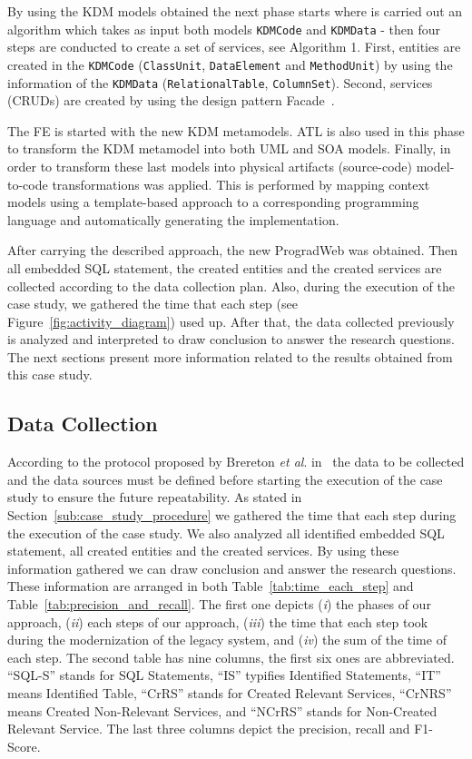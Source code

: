 \documentclass[a4paper,twoside]{article}
\begin{document}
By using the KDM models obtained the next phase starts where is carried out an algorithm which takes as input both models \texttt{KDMCode} and \texttt{KDMData} - then four steps are conducted to create a set of services, see Algorithm 1. First, entities are created in the \texttt{KDMCode} (\texttt{ClassUnit}, \texttt{DataElement} and \texttt{MethodUnit}) by using the information of the \texttt{KDMData} (\texttt{RelationalTable}, \texttt{ColumnSet}). Second, services (CRUDs) are created by using the design pattern Facade~\cite{Gamma1994}.

The FE is started with the new KDM metamodels. ATL is also used in this phase to transform the KDM metamodel into both UML and SOA models. Finally, in order to transform these last models into physical artifacts (source-code) model-to-code transformations was applied. This is performed by mapping context models using a template-based approach to a corresponding
programming language and automatically generating the implementation.

After carrying the described approach, the new ProgradWeb was obtained. Then all embedded SQL statement, the created entities and the created services are collected according to the data collection plan. Also, during the execution of the case study, we gathered the time that each step (see Figure~\ref{fig:activity_diagram}) used up. After that, the data collected previously is analyzed and interpreted to draw conclusion to answer the research questions. The next sections present more information related to the results obtained from this case study.

\subsection{Data Collection} %
\label{sub:data_collection}

According to the protocol proposed by Brereton \textit{et al}. in~\cite{case-study-template-2008} the data to be collected and the data sources must be defined before starting the execution of the case study to ensure the future repeatability. As stated in Section~\ref{sub:case_study_procedure} we gathered the time that each step during the execution of the case study. We also analyzed all identified embedded SQL statement, all created entities and the created services. By using these information gathered we can draw conclusion and answer the research questions. These information are arranged in both Table~\ref{tab:time_each_step} and Table~\ref{tab:precision_and_recall}. The first one depicts (\textit{i})  the phases of our approach, (\textit{ii}) each steps of our approach, (\textit{iii}) the time that each step took during the modernization of the legacy system, and (\textit{iv}) the sum of the time of each step. The second table has nine columns, the first six ones are abbreviated. ``SQL-S'' stands for SQL Statements, ``IS'' typifies Identified Statements, ``IT'' means Identified Table, ``CrRS'' stands for Created Relevant Services, ``CrNRS'' means Created Non-Relevant Services, and ``NCrRS'' stands for Non-Created Relevant Service. The last three columns depict the precision, recall and F1-Score. 
\end{document}
